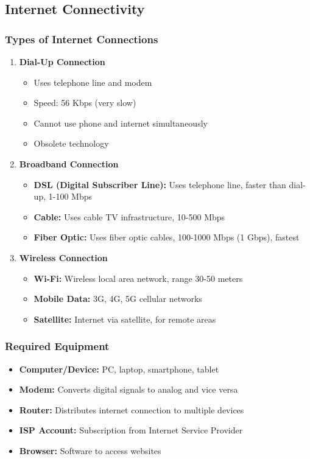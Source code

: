 \documentclass[12pt,a4paper]{article}
\begin{document}
\subsection{Internet Connectivity}

\subsubsection{Types of Internet Connections}

\begin{enumerate}
    \item \textbf{Dial-Up Connection}
    \begin{itemize}
        \item Uses telephone line and modem
        \item Speed: 56 Kbps (very slow)
        \item Cannot use phone and internet simultaneously
        \item Obsolete technology
    \end{itemize}
    
    \item \textbf{Broadband Connection}
    \begin{itemize}
        \item \textbf{DSL (Digital Subscriber Line):} Uses telephone line, faster than dial-up, 1-100 Mbps
        \item \textbf{Cable:} Uses cable TV infrastructure, 10-500 Mbps
        \item \textbf{Fiber Optic:} Uses fiber optic cables, 100-1000 Mbps (1 Gbps), fastest
    \end{itemize}
    
    \item \textbf{Wireless Connection}
    \begin{itemize}
        \item \textbf{Wi-Fi:} Wireless local area network, range 30-50 meters
        \item \textbf{Mobile Data:} 3G, 4G, 5G cellular networks
        \item \textbf{Satellite:} Internet via satellite, for remote areas
    \end{itemize}
\end{enumerate}

\subsubsection{Required Equipment}
\begin{itemize}
    \item \textbf{Computer/Device:} PC, laptop, smartphone, tablet
    \item \textbf{Modem:} Converts digital signals to analog and vice versa
    \item \textbf{Router:} Distributes internet connection to multiple devices
    \item \textbf{ISP Account:} Subscription from Internet Service Provider
    \item \textbf{Browser:} Software to access websites
\end{itemize}
\end{document}
